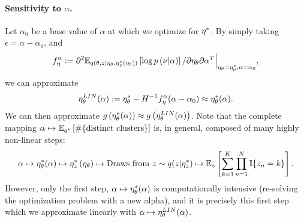 \paragraph{Sensitivity to $\alpha$.}
%
Let $\alpha_0$ be a base value of $\alpha$ at which we optimize for
$\eta^{*}$. By simply taking $\epsilon = \alpha - \alpha_0$, and
%
\begin{align*}
f^\alpha_\eta := \partial^2
    \mathbb{E}_{q\left(\theta, z \vert \eta_\theta, \eta_z^{*}(\eta_\theta)\right)}
        \left[ \log p\left(\nu \vert \alpha \right) \right]
    / \partial \eta_\theta \partial \alpha^T
    \Big\rvert_{\eta_\theta = \eta_\theta^{*}, \alpha = \alpha_0},
\end{align*}
%
we can approximate
%
\begin{align*}
\eta_\theta^{LIN}(\alpha) := \eta_\theta^{*} -
  H^{-1} f^\alpha_\eta (\alpha - \alpha_0) \approx \eta_\theta^{*}(\alpha).
\end{align*}
%
We can then approximate
$g\left(\eta_\theta^{*}(\alpha)\right) \approx g\left(\eta_\theta^{LIN}(\alpha)\right)$.
Note that the complete mapping
$\alpha \mapsto \mathbb{E}_{q^{*}} \left[ \#\{\text{distinct clusters}\} \right]$
is, in general, composed of many highly non-linear steps:
%
\begin{align}
\alpha \mapsto
\eta_\theta^{*}(\alpha) \mapsto
\eta_z^{*}\left(\eta_\theta\right) \mapsto
\textrm{Draws from }z \sim q(z \vert \eta_z^{*}) \mapsto
\mathbb{E}_z\left[\sum_{k=1}^K \prod_{n=1}^N \mathbb{I}\{z_n = k\}\right].
\end{align}
%
However, only the first step, $\alpha \mapsto \eta_\theta^{*}(\alpha)$ is
computationally intensive (re-solving the optimization problem
 with a new alpha), and it is precisely this
first step which we approximate linearly with $\alpha \mapsto
\eta_\theta^{LIN}(\alpha)$.

